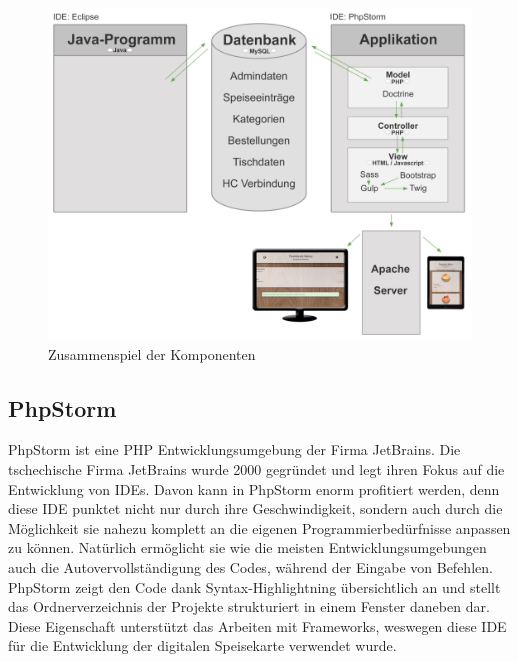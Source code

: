 			\begin{figure}[H]
			\begin{centering}
			\includegraphics[width = 1\textwidth]{Bilder/Jok_zusammenspiel_applikation}
			\par\end{centering}
			\caption{Zusammenspiel der Komponenten}
			\label{Zusammenspiel der Komponenten}
			\end{figure}
			
  \subsection{PhpStorm}
    
PhpStorm ist eine PHP Entwicklungsumgebung der Firma JetBrains. Die tschechische Firma JetBrains wurde 2000 gegründet und legt ihren Fokus auf die Entwicklung von IDEs. Davon kann in PhpStorm enorm profitiert werden, denn diese IDE punktet nicht nur durch ihre Geschwindigkeit, sondern auch durch die Möglichkeit sie nahezu komplett an die eigenen Programmierbedürfnisse anpassen zu können. Natürlich ermöglicht sie wie die meisten Entwicklungsumgebungen auch die Autovervollständigung des Codes, während der Eingabe von Befehlen. PhpStorm zeigt den Code dank Syntax-Highlightning übersichtlich an und stellt das Ordnerverzeichnis der Projekte strukturiert in einem Fenster daneben dar. Diese Eigenschaft unterstützt das Arbeiten mit Frameworks, weswegen diese IDE für die Entwicklung der digitalen Speisekarte verwendet wurde.

			
